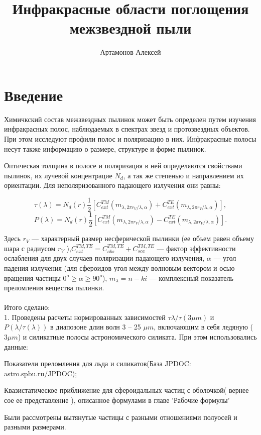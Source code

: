 \documentclass[a4paper,10pt]{article}
\title{Инфракрасные области поглощения межзвездной пыли}
\author{Артамонов Алексей}
\begin{document}
\maketitle


\section{Введение}
\par Химичкский состав межзвездных пылинок может быть определен
путем изучения инфракрасных полос, наблюдаемых в спектрах звезд и 
протозвездных объектов. При этом исследуют профили полос и поляризацию в них.
Инфракрасные полосы несут также информацию о размере, структуре 
и форме пылинок.\\
\par Оптическая толщина в полосе и поляризация в ней определяются свойствами пылинок,
их лучевой концентрацие	 $N_d$, а так же степенью и направлением их ориентации.
Для неполяризованного падающего излучения они равны:

$$\tau(\lambda) = N_d(r)\frac{1}{2}[C^{TM}_{ext}(m_{\lambda,2\pi r_V/\lambda,\alpha})+C^{TE}_{ext}(m_{\lambda,2\pi r_V/\lambda,\alpha})],$$
$$P(\lambda) = N_d(r)\frac{1}{2}[C^{TM}_{ext}(m_{\lambda,2\pi r_V/\lambda,\alpha})-C^{TE}_{ext}(m_{\lambda,2\pi r_V/\lambda,\alpha})].$$

Здесь $r_V$ --- характерный размер несферической пылинки (ее объем равен объему шара с радиусом $r_V$
),$C^{TM,TE}_{ext} = C^{TM,TE}_{abs}+C^{TM,TE}_{sca}$ --- фактор эффективности ослабления для двух
случаев поляризации падающего излучения, $\alpha$ --- угол падения излучения 
(для сфероидов угол между волновым вектором и осью вращения частицы $0^{o}\geq\alpha\geq90^{o}$),
$m_\lambda = n - ki$ --- комплексный показатель преломления вещества пылинки.
\\
\\
Итого сделано:\\
1. Проведены расчеты нормированных зависимостей $\tau{\lambda}/\tau(3\mu m)$ и $P(\lambda/\tau(\lambda))$ 
в диапозоне длин волн 3 -- 25 $\mu m$, включающим в себя ледяную ($3\mu m$) и силикатные полосы астрономического силиката.
При этом использовались данные:
\par Показатели преломления для льда и силикатов(База JPDOC: astro.spbu.ru/JPDOC);
\par Квазистатическое приближение для сфероидальных частиц с оболочкой( вернее сое ее представление ), 
описанное формулами в главе 'Рабочие формулы'
\\
\par Были рассмотрены вытянутые частицы с разными отношениями полуосей и разными размерами.
\newpage
\end{document}
